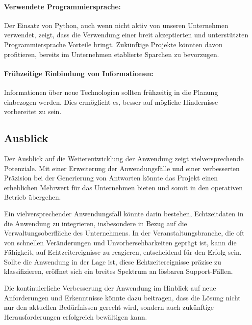 \paragraph{Verwendete Programmiersprache:} 
Der Einsatz von Python, auch wenn nicht aktiv von 
unseren Unternehmen verwendet, zeigt, dass die Verwendung einer breit akzeptierten
und unterstützten Programmiersprache Vorteile bringt. Zukünftige Projekte 
könnten davon profitieren, bereits im Unternehmen etablierte Sparchen zu bevorzugen. 

\paragraph{Frühzeitige Einbindung von Informationen:} 
Informationen über neue Technologien sollten frühzeitig in die Planung einbezogen werden. 
Dies ermöglicht es, besser auf mögliche Hindernisse vorbereitet zu sein.

\subsection{Ausblick}
\label{sec:Ausblick}
Der Ausblick auf die Weiterentwicklung der Anwendung zeigt vielversprechende Potenziale. 
Mit einer Erweiterung der Anwendungsfälle und einer verbesserten 
Präzision bei der Generierung von Antworten könnte das Projekt einen erheblichen 
Mehrwert für das Unternehmen bieten und somit in den operativen Betrieb übergehen.

Ein vielversprechender Anwendungsfall könnte darin bestehen, Echtzeitdaten in die Anwendung zu 
integrieren, insbesondere in Bezug auf die Verwaltungsoberfläche des Unternehmens. 
In der Veranstaltungsbranche, die oft von schnellen Veränderungen und Unvorhersehbarkeiten geprägt ist, 
kann die Fähigkeit, auf Echtzeitereignisse zu reagieren, entscheidend für den Erfolg sein. 
Sollte die Anwendung in der Lage ist, diese Echtzeitereignisse präzise zu klassifizieren, 
eröffnet sich ein breites Spektrum an lösbaren Support-Fällen.

Die kontinuierliche Verbesserung der Anwendung im Hinblick auf neue Anforderungen und Erkenntnisse
könnte dazu beitragen, dass die Lösung nicht nur den aktuellen Bedürfnissen gerecht wird, 
sondern auch zukünftige Herausforderungen erfolgreich bewältigen kann.

\clearpage
